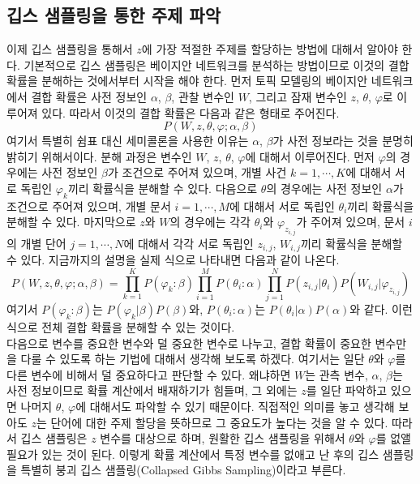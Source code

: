\documentclass[a4paper]{oblivoir}
\begin{document}
\subsection{깁스 샘플링을 통한 주제 파악}

이제 깁스 샘플링을 통해서 $z$에 가장 적절한 주제를 할당하는 방법에 대해서 알아야 한다. 기본적으로 깁스 샘플링은 베이지안 네트워크를 분석하는 방법이므로 이것의 결합 확률을 분해하는 것에서부터 시작을 해야 한다. 먼저 토픽 모델링의 베이지안 네트워크에서 결합 확률은 사전 정보인 $\alpha$, $\beta$, 관찰 변수인 $W$, 그리고 잠재 변수인 $z$, $\theta$, $\varphi$로 이루어져 있다. 따라서 이것의 결합 확률은 다음과 같은 형태로 주어진다.  
\begin{equation}
P(W,z,\theta,\varphi ; \alpha,\beta)
\label{eq:10-31}
\end{equation} 
여기서 특별히 쉼표 대신 세미콜론을 사용한 이유는 $\alpha$, $\beta$가 사전 정보라는 것을 분명히 밝히기 위해서이다. 분해 과정은 변수인 $W$, $z$, $\theta$, $\varphi$에 대해서 이루어진다. 먼저 $\varphi$의 경우에는 사전 정보인 $\beta$가 조건으로 주어져 있으며, 개별 사건 $k=1,\cdots,K$에 대해서 서로 독립인 $\varphi_k$끼리 확률식을 분해할 수 있다. 다음으로 $\theta$의 경우에는 사전 정보인 $\alpha$가 조건으로 주어져 있으며, 개별 문서 $i=1,\cdots,M$에 대해서 서로 독립인 $\theta_i$끼리 확률식을 분해할 수 있다. 마지막으로 $z$와 $W$의 경우에는 각각 $\theta_{i}$와 $\varphi_{z_{i,j}}$가 주어져 있으며, 문서 $i$의 개별 단어 $j=1,\cdots,N$에 대해서 각각 서로 독립인 $z_{i,j}$, $W_{i,j}$끼리 확률식을 분해할 수 있다. 지금까지의 설명을 실제 식으로 나타내면 다음과 같이 나온다. 
\begin{equation}
P(W,z,\theta,\varphi ; \alpha,\beta) = \prod_{k=1}^{K} P(\varphi_k:\beta) \prod_{i=1}^{M} P(\theta_i:\alpha) \prod_{j=1}^{N} P(z_{i,j}|\theta_i) P(W_{i,j}|\varphi_{z_{i,j}})   
\label{eq:10-32}
\end{equation} 
여기서 $P(\varphi_k:\beta)$는 $P(\varphi_k|\beta)P(\beta)$와, $P(\theta_i:\alpha)$는 $P(\theta_i|\alpha)P(\alpha)$와 같다. 이런 식으로 전체 결합 확률을 분해할 수 있는 것이다. \\

다음으로 변수를 중요한 변수와 덜 중요한 변수로 나누고, 결합 확률이 중요한 변수만을 다룰 수 있도록 하는 기법에 대해서 생각해 보도록 하겠다. 여기서는 일단 $\theta$와 $\varphi$를 다른 변수에 비해서 덜 중요하다고 판단할 수 있다. 왜냐하면 $W$는 관측 변수, $\alpha$, $\beta$는 사전 정보이므로 확률 계산에서 배재하기가 힘들며, 그 외에는 $z$를 일단 파악하고 있으면 나머지 $\theta$, $\varphi$에 대해서도 파악할 수 있기 때문이다. 직접적인 의미를 놓고 생각해 보아도 $z$는 단어에 대한 주제 할당을 뜻하므로 그 중요도가 높다는 것을 알 수 있다. 따라서 깁스 샘플링은 $z$ 변수를 대상으로 하며, 원활한 깁스 샘플링을 위해서 $\theta$와 $\varphi$를 없앨 필요가 있는 것이 된다. 이렇게 확률 계산에서 특정 변수를 없애고 난 후의 깁스 샘플링을 특별히 붕괴 깁스 샘플링(Collapsed Gibbs Sampling)이라고 부른다. \\
\end{document}
